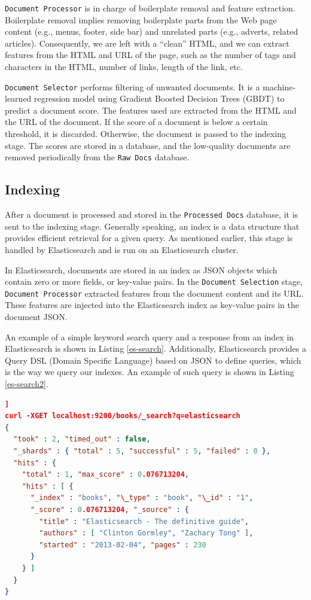 \texttt{Document Processor} is in charge of boilerplate removal and feature extraction. Boilerplate removal implies removing boilerplate parts from the Web page content (e.g., menus, footer, side bar) and unrelated parts (e.g., adverts, related articles). Consequently, we are left with a ``clean'' HTML, and we can extract features from the HTML and URL of the page, such as the number of tags and characters in the HTML, number of links, length of the link, etc.

\texttt{Document Selector} performs filtering of unwanted documents. It is a machine-learned regression model using Gradient Boosted Decision Trees (GBDT) to predict a document score. The features used are extracted from the HTML and the URL of the document. If the score of a document is below a certain threshold, it is discarded. Otherwise, the document is passed to the indexing stage. The scores are stored in a database, and the low-quality documents are removed periodically from the \texttt{Raw Docs} database.

\subsection{Indexing}
After a document is processed and stored in the \texttt{Processed Docs} database, it is sent to the indexing stage. Generally speaking, an index is a data structure that provides efficient retrieval for a given query. As mentioned earlier, this stage is handled by Elasticsearch and is run on an Elasticsearch cluster.

In Elasticsearch, documents are stored in an index as JSON objects which contain zero or more fields, or key-value pairs. In the \texttt{Document Selection} stage, \texttt{Document Processor} extracted features from the document content and its URL. These features are injected into the Elasticsearch index as key-value pairs in the document JSON.

An example of a simple keyword search query and a response from an index in Elasticsearch is shown in Listing \ref{es-search}. Additionally, Elasticsearch provides a Query DSL (Domain Specific Language) based on JSON to define queries, which is the way we query our indexes. An example of such query is shown in Listing \ref{es-search2}.

\begin{lstlisting}[language=json,firstnumber=1,caption=Example of a keyword search query and response in Elasticsearch., label=es-search]]
curl -XGET localhost:9200/books/_search?q=elasticsearch
{
  "took" : 2, "timed_out" : false,
  "_shards" : { "total" : 5, "successful" : 5, "failed" : 0 },
  "hits" : {
    "total" : 1, "max_score" : 0.076713204,
    "hits" : [ {
      "_index" : "books", "\_type" : "book", "\_id" : "1",
      "_score" : 0.076713204, "_source" : {
        "title" : "Elasticsearch - The definitive guide",
        "authors" : [ "Clinton Gormley", "Zachary Tong" ],
        "started" : "2013-02-04", "pages" : 230
      }
    } ]
  }
}
\end{lstlisting}

